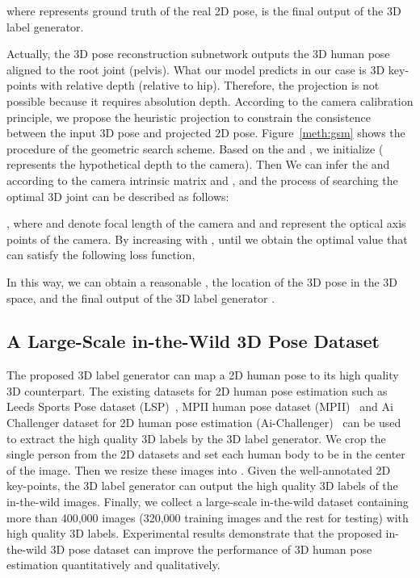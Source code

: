 \documentclass[10pt,twocolumn,letterpaper]{article}
\begin{document}
where  represents ground truth of the real 2D pose,  is the final output of the 3D label generator.


Actually, the 3D pose reconstruction subnetwork outputs the 3D human pose aligned to the root joint (pelvis).
What our model predicts in our case is 3D key-points with relative depth (relative to hip). Therefore, the projection is not possible because it requires absolution depth.
According to the camera calibration principle, we propose the heuristic projection to constrain the consistence between the input 3D pose and projected 2D pose.
Figure~\ref{meth:gsm} shows the procedure of the geometric search scheme.
Based on the  and , we initialize  ( represents the hypothetical depth to the camera).
Then We can infer the  and  according to the camera intrinsic matrix and , and the process of searching the optimal 3D joint can be described as follows:

, where  and  denote focal length of the camera and  and  represent the optical axis points of the camera.
By increasing  with , until we obtain the optimal value that can satisfy the following loss function,

In this way, we can obtain a reasonable , the location of the 3D pose  in the 3D space, and the final output of the 3D label generator . 
\subsection{A Large-Scale in-the-Wild 3D Pose Dataset}
The proposed 3D label generator can map a 2D human pose to its high quality 3D counterpart.
The existing datasets for 2D human pose estimation such as Leeds Sports Pose dataset (LSP)~\cite{johnsonclustered}, MPII human pose dataset (MPII)~\cite{andriluka14cvpr} and Ai Challenger dataset for 2D human pose estimation (Ai-Challenger)~\cite{wu2017ai} can be used to extract the high quality 3D labels by the 3D label generator.
We crop the single person from the 2D datasets and set each human body to be in the center of the image.
Then we resize these images into .
Given the well-annotated 2D key-points, the 3D label generator can output the high quality 3D labels of the in-the-wild images.
Finally, we collect a large-scale in-the-wild dataset containing more than 400,000 images (320,000 training images and the rest for testing) with high quality 3D labels.
Experimental results demonstrate that the proposed in-the-wild 3D pose dataset can improve the performance of 3D human pose estimation quantitatively and qualitatively.
\end{document}

